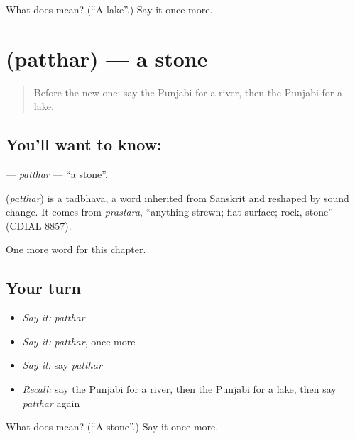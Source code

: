 \begin{tcolorbox}[breakable,colback=teal!4,colframe=teal!35!black,title={Before you move on}]
What does  mean? (\textquotedblleft{}A lake\textquotedblright{}.) Say it once more.
\end{tcolorbox}
\section[\texorpdfstring{\pa{ਪੱਥਰ} (patthar)}{ਪੱਥਰ (patthar)}]{ (patthar) — a stone}

\label{lesson:PA-C74-patthar}



\begin{quote}
Before the new one: say the Punjabi for a river, then the Punjabi for a lake.
\end{quote}

\subsection*{You'll want to know: }
\textbf{} — \emph{patthar} — \textquotedblleft{}a stone\textquotedblright{}.

\begin{cousinweb}
\textbf{} (\emph{patthar}) is a tadbhava, a word inherited from Sanskrit and reshaped by sound change. It comes from \emph{prastara}, \textquotedblleft{}anything strewn; flat surface; rock, stone\textquotedblright{} (CDIAL 8857).
\end{cousinweb}

\begin{grammarlens}[title={What you've built}]
One more word for this chapter.
\end{grammarlens}

\subsection*{Your turn}
\begin{itemize}
\raggedright
  \item \emph{Say it:} \emph{patthar}
  \item \emph{Say it:} \emph{patthar}, once more
  \item \emph{Say it:} say \emph{patthar}
  \item \emph{Recall:} say the Punjabi for a river, then the Punjabi for a lake, then say \emph{patthar} again
\end{itemize}

\begin{tcolorbox}[breakable,colback=teal!4,colframe=teal!35!black,title={Before you move on}]
What does  mean? (\textquotedblleft{}A stone\textquotedblright{}.) Say it once more.
\end{tcolorbox}
